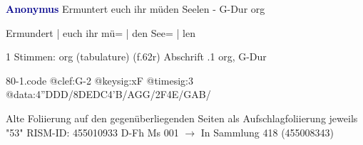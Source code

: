 \documentclass[twocolumn]{book}
\begin{document}
\newline \par \vspace{7pt} \textcolor{darkblue}{\textbf{Anonymus  }}
\newline Ermuntert euch ihr müden Seelen - G-Dur
\newline org
\newline \begin{itshape}[f.62r, at left:] Ermundert | euch ihr mü= | den See= | len\end{itshape} 
\newline \textcolor{darkblue}{}  1 Stimmen: org (tabulature)  (f.62r)
\newline Abschrift
.1  org, G-Dur  
\begin{filecontents*}{80-1.code}
@clef:G-2
@keysig:xF
@timesig:3
@data:4''DDD/{8DEDC}4'B/AGG/2F4E/GAB/
\end{filecontents*}
\newline
%
\newline Alte Foliierung auf den gegenüberliegenden Seiten als Aufschlagfoliierung jeweils "53"
\newline RISM-ID: 455010933
\newline D-Fh  Ms 001
\newline $\rightarrow$ In Sammlung 418 (455008343)
      
\end{document}
